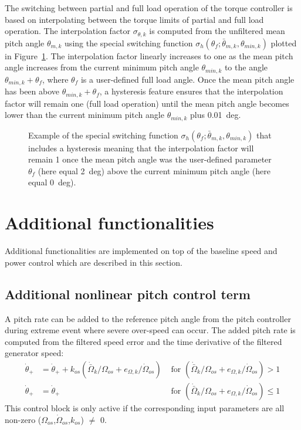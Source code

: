 The switching between partial and full load operation of the torque controller is based on interpolating between the torque limits of partial and full load operation. The interpolation factor $\sigma_{\theta,k}$ is computed from the unfiltered mean pitch angle $\theta_{m,k}$ using the special switching function $\sigma_h \left(\theta_{f}; \bar \theta_{m,k} , \theta_{min,k}\right)$ plotted in Figure~\ref{f:sigma_hys}. The interpolation factor linearly increases to one as the mean pitch angle increases from the current minimum pitch angle $\theta_{min,k}$ to the angle $\theta_{min,k} + \theta_{f}$, where $\theta_f$ is a user-defined full load angle. Once the mean pitch angle has been above $\theta_{min,k} + \theta_{f}$, a hysteresis feature ensures that the interpolation factor will remain one (full load operation) until the mean pitch angle becomes lower than the current minimum pitch angle $\theta_{min,k}$ plus 0.01~deg.

\begin{figure}[t]
\centerline{ }
\caption{Example of the special switching function $\sigma_h \left(\theta_{f}; \bar \theta_{m,k} , \theta_{min,k}\right)$ that includes a hysteresis meaning that the interpolation factor will remain 1 once the mean pitch angle was the user-defined parameter $\theta_{f}$ (here equal 2~deg) above the current minimum pitch angle (here equal 0~deg). \label{f:sigma_hys}}
\end{figure}





\section{Additional functionalities}

Additional functionalities are implemented on top of the baseline speed and power control which are described in this section.

\subsection{Additional nonlinear pitch control term}

A pitch rate can be added to the reference pitch angle from the pitch controller during extreme event where severe over-speed can occur. The added pitch rate is computed from the filtered speed error and the time derivative of the filtered generator speed:
\begin{align}
	\dot{\theta}_{+} &= \dot{\theta}_{+} + k_{os} ( \dot{\bar{\Omega}}_k/\Omega_{os} + e_{\Omega,k}/\dot{\Omega}_{os} ) &\text{ for } ( \dot{\bar{\Omega}}_k/\Omega_{os} + e_{\Omega,k}/\dot{\Omega}_{os} ) > 1 \\
	\dot{\theta}_{+} &= \dot{\theta}_{+} &\text{ for } ( \dot{\bar{\Omega}}_k/\Omega_{os} + e_{\Omega,k}/\dot{\Omega}_{os} ) \leq 1	
\end{align}
This control block is only active if the corresponding input parameters are all non-zero ($\Omega_{os}$,$\dot{\Omega}_{os}$,$k_{os}$) $\neq$ 0.

